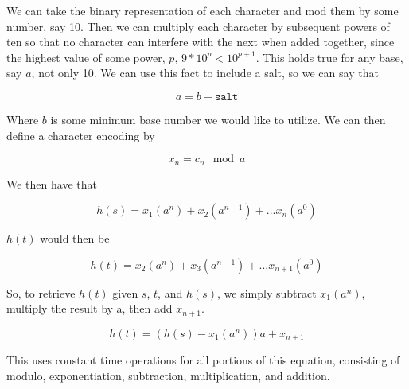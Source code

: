 \documentclass[answers, 12pt]{article}
\begin{document}
We can take the binary representation of each character and mod them by some number, say 10. Then we can multiply each character by subsequent powers of ten so that no character can interfere with the next when added together, since the highest value of some power, $p$, $9 * 10^p < 10^{p+1}$. This holds true for any base, say $a$, not only 10. We can use this fact to include a salt, so we can say that 

\[
  a = b + \texttt{salt}
\]

Where $b$ is some minimum base number we would like to utilize. We can then define a character encoding by

\[
  x_n = c_n \mod a
\]

We then have that 

\[
  h(s) = x_1(a^n) + x_2(a^{n-1}) + ... x_n(a^0)
\] 

 $h(t)$ would then be 
 
 \[
  h(t) = x_2(a^{n}) + x_3(a^{n-1}) + ... x_{n+1}(a^0)
\]

So, to retrieve $h(t)$ given $s$, $t$, and $h(s)$, we simply subtract $x_1(a^n)$, multiply the result by a, then add $x_{n+1}$.

 \[
  h(t) = (h(s) - x_1(a^n))a + x_{n+1}
\]

This uses constant time operations for all portions of this equation, consisting of modulo, exponentiation, subtraction, multiplication, and addition.
\end{document}
